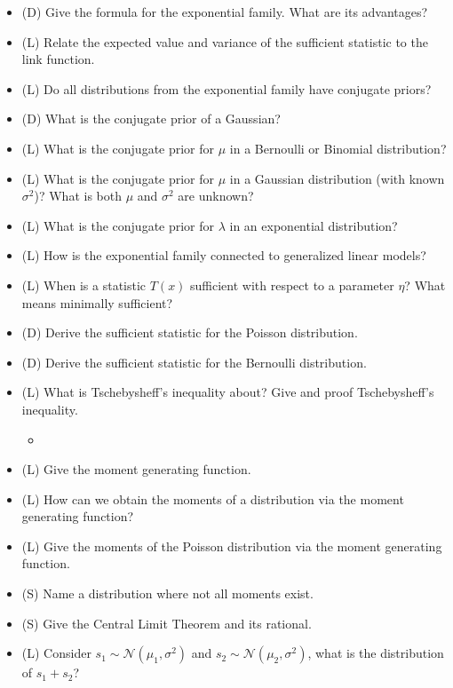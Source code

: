 \begin{itemize}
    \item (D) Give the formula for the exponential family. What are its advantages?
    \item (L) Relate the expected value and variance of the sufficient statistic to the link function.
    \item (L) Do all distributions from the exponential family have conjugate priors?
    \item (D) What is the conjugate prior of a Gaussian?
    \item (L) What is the conjugate prior for $\mu$ in a Bernoulli or Binomial distribution?
    \item (L) What is the conjugate prior for $\mu$ in a Gaussian distribution (with known $\sigma^2$)? What
    is both $\mu$ and $\sigma^2$ are unknown?
    \item (L) What is the conjugate prior for $\lambda$ in an exponential distribution?
    \item (L) How is the exponential family connected to generalized linear models?
    \item (L) When is a statistic $T(x)$ sufficient with respect to a parameter $\eta$? What means minimally sufficient?
    \item (D) Derive the sufficient statistic for the Poisson distribution.
    \item (D) Derive the sufficient statistic for the Bernoulli distribution.
    \item (L) What is Tschebysheff's inequality about? Give and proof Tschebysheff's inequality.
    \begin{itemize}
        \item {}
    \end{itemize}
    \item (L) Give the moment generating function.
    \item (L) How can we obtain the moments of a distribution via the moment generating function?
    \item (L) Give the moments of the Poisson distribution via the moment generating function.
    \item (S) Name a distribution where not all moments exist.
    \item (S) Give the Central Limit Theorem and its rational.
    \item (L) Consider $s_1 \sim \mathcal{N}(\mu_1,\sigma^2)$ and $s_2 \sim \mathcal{N}(\mu_2,\sigma^2)$, what is the distribution of $s_1 + s_2$?
\end{itemize}

